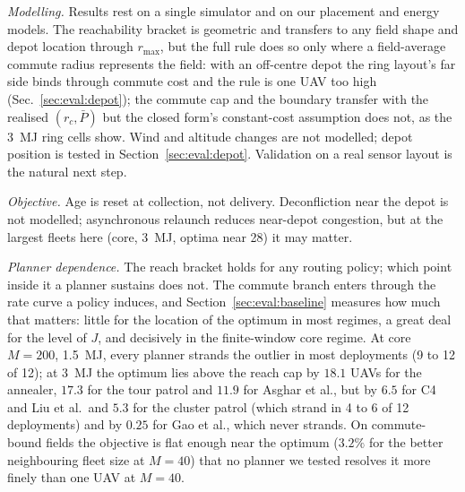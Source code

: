 \documentclass[journal,outdir=./]{IEEEtran}
\newcommand{\rmax}{r_{\max}}
\newcommand{\rc}{r_{c}}
\newcommand{\Pbar}{\bar{P}}
\begin{document}
\textit{Modelling.} Results rest on a single simulator and on our placement and energy models. The reachability bracket is geometric and transfers to any field shape and depot location through $\rmax$, but the full rule does so only where a field-average commute radius represents the field: with an off-centre depot the ring layout's far side binds through commute cost and the rule is one UAV too high (Sec.~\ref{sec:eval:depot}); the commute cap and the boundary transfer with the realised $(\rc,\Pbar)$ but the closed form's constant-cost assumption does not, as the 3~MJ ring cells show. Wind and altitude changes are not modelled; depot position is tested in Section~\ref{sec:eval:depot}. Validation on a real sensor layout is the natural next step.

\textit{Objective.} Age is reset at collection, not delivery. Deconfliction near the depot is not modelled; asynchronous relaunch reduces near-depot congestion, but at the largest fleets here (core, 3~MJ, optima near 28) it may matter.

\textit{Planner dependence.} The reach bracket holds for any routing policy; which point inside it a planner sustains does not. The commute branch enters through the rate curve a policy induces, and Section~\ref{sec:eval:baseline} measures how much that matters: little for the location of the optimum in most regimes, a great deal for the level of $J$, and decisively in the finite-window core regime. At core $M=200$, 1.5~MJ, every planner strands the outlier in most deployments (9 to 12 of 12); at 3~MJ the optimum lies above the reach cap by $18.1$ UAVs for the annealer, $17.3$ for the tour patrol and $11.9$ for Asghar et al., but by $6.5$ for C4 and Liu et al.\ and $5.3$ for the cluster patrol (which strand in 4 to 6 of 12 deployments) and by $0.25$ for Gao et al., which never strands. On commute-bound fields the objective is flat enough near the optimum ($3.2\%$ for the better neighbouring fleet size at $M=40$) that no planner we tested resolves it more finely than one UAV at $M=40$.
\end{document}

